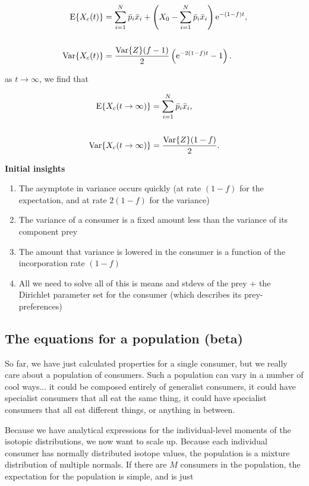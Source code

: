 \documentclass[11pt]{article}
\begin{document}
\begin{align}
	{\rm E}\{X_c(t)\} &= \sum_{i=1}^N \bar{p}_i \bar{x}_i + \left(X_0-\sum_{i=1}^N \bar{p}_i \bar{x}_i\right){\rm e}^{-(1-f)t}, \nonumber \\ \nonumber \\ 
	{\rm Var}\{X_c(t)\} &= \frac{{\rm Var}\{Z\}(f-1)}{2}\left({\rm e}^{-2(1-f)t} -1\right).
\end{align}

\noindent as $t\rightarrow \infty$, we find that 

\begin{align}
	{\rm E}\{X_c(t\rightarrow \infty)\} &= \sum_{i=1}^N \bar{p}_i \bar{x}_i, \nonumber \\ \nonumber \\ 
	{\rm Var}\{X_c(t\rightarrow \infty)\} &= \frac{{\rm Var}\{Z\}(1-f)}{2}.
\end{align}

{\bf Initial insights}

\begin{enumerate}
\item The asymptote in variance occurs quickly (at rate $(1-f)$ for the expectation, and at rate $2(1-f)$ for the variance)
\item The variance of a consumer is a fixed amount less than the variance of its component prey
\item The amount that variance is lowered in the consumer is a function of the incorporation rate $(1-f)$ 
\item All we need to solve all of this is means and stdevs of the prey + the Dirichlet parameter set for the consumer (which describes its prey-preferences)
\end{enumerate}


\subsection{The equations for a population (beta)}
So far, we have just calculated properties for a single consumer, but we really care about a population of consumers.
Such a population can vary in a number of cool ways... it could be composed entirely of generalist consumers, it could have specialist consumers that all eat the same thing, it could have specialist consumers that all eat different things, or anything in between.

Because we have analytical expressions for the individual-level moments of the isotopic distributions, we now want to scale up.
Because each individual consumer has normally distributed isotope values, the population is a mixture distribution of multiple normals.
If there are $M$ consumers in the population, the expectation for the population is simple, and is just
\end{document}
